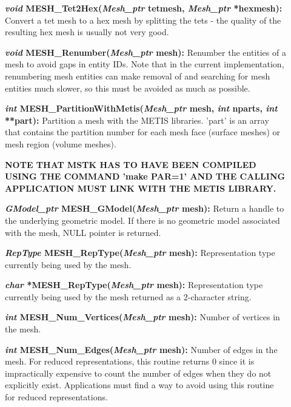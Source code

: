 \documentclass[12pt]{article}
\begin{document}
\begin{description}
\item[]{\bf {\em void} MESH\_Tet2Hex({\em Mesh\_ptr} tetmesh, {\em
      Mesh\_ptr} *hexmesh):} Convert a tet mesh to a hex mesh by
  splitting the tets - the quality of the resulting hex mesh is
  usually not very good.

\item[]{\bf {\em void} MESH\_Renumber({\em Mesh\_ptr} mesh):} Renumber
  the entities of a mesh to avoid gaps in entity IDs. Note that in the
  current implementation, renumbering mesh entities can make removal
  of and searching for mesh entities much slower, so this must be
  avoided as much as possible.

\item[]{\bf {\em int} MESH\_PartitionWithMetis({\em Mesh\_ptr} mesh,
    {\em int} nparts, {\em int} **part):} Partition a mesh with the
  METIS libraries. 'part' is an array that contains the partition
  number for each mesh face (surface meshes) or mesh region (volume
  meshes). 

  \par {\bf NOTE THAT MSTK HAS TO HAVE BEEN COMPILED USING THE COMMAND
    'make PAR=1' AND THE CALLING APPLICATION MUST LINK WITH THE METIS
    LIBRARY.}

\item[]

\item[]{\bf {\em GModel\_ptr} MESH\_GModel({\em Mesh\_ptr} mesh):}
Return a handle to the underlying geometric model. If there is no
geometric model associated with the mesh, NULL pointer is returned.

\item[]{\bf {\em RepType} MESH\_RepType({\em Mesh\_ptr} mesh):}
Representation type currently being used by the mesh.

\item[]{\bf {\em char } *MESH\_RepType({\em Mesh\_ptr} mesh):}
  Representation type currently being used by the mesh returned as a
  2-character string.

\item[]

\item[]{\bf {\em int} MESH\_Num\_Vertices({\em Mesh\_ptr} mesh):}
Number of vertices in the mesh.

\item[]{\bf {\em int} MESH\_Num\_Edges({\em Mesh\_ptr} mesh):}
Number of edges in the mesh. For reduced representations, this routine
returns 0 since it is impractically expensive to count the number of
edges when they do not explicitly exist. Applications must find a way
to avoid using this routine for reduced representations.


\end{description}
\end{document}
